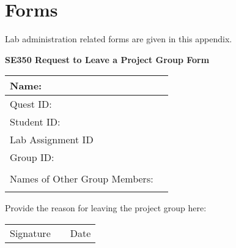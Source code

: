 \chapter{Forms}
Lab administration related forms are given in this appendix.
\newpage
\begin{center}
{\bf SE350 Request to Leave a Project Group Form}
\end{center}

\begin{table*}[h]
    \begin{center}
          \begin{tabular}{|p{6cm}|p{6cm}|}
          \hline
          Name:             & \\ \hline
          Quest ID:         & \\ \hline
          Student ID:       & \\ \hline
          Lab Assignment ID & \\ \hline
          Group ID:         & \\ \hline
                                         & \\ 
          Names of Other Group Members:  & \\
                                         & \\ \hline
          \end{tabular}
    \end{center}
\end{table*}

Provide the reason for leaving the project group here:

\vspace{9cm}

\begin{table*}
\begin{center}
\begin{tabular}{p{6cm} p{1cm} p{6cm}}
Signature && Date \\
\cline{1-1}
\cline{3-3}
\end{tabular}
\end{center}
\end{table*}
